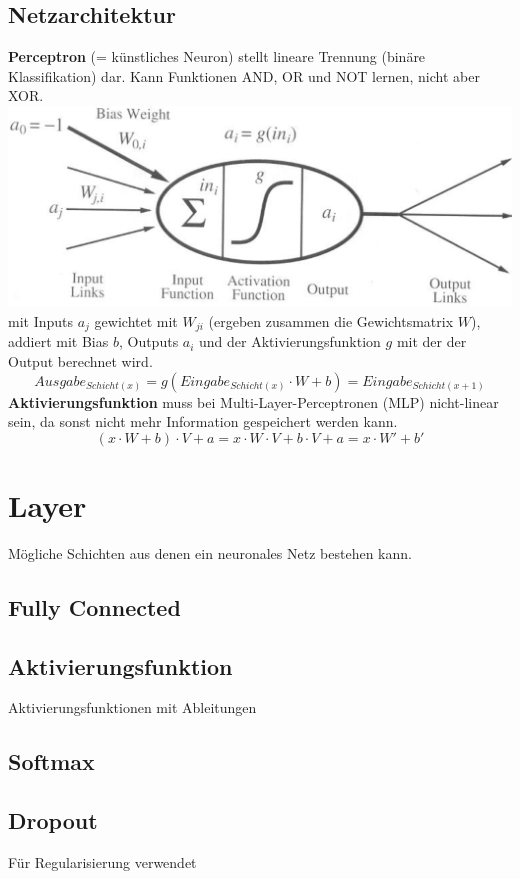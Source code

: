 \documentclass[12pt]{article}
\begin{document}
	\subsection{Netzarchitektur}
	\textbf{Perceptron} (= künstliches Neuron) stellt lineare Trennung (binäre Klassifikation) dar. Kann Funktionen AND, OR und NOT lernen, nicht aber XOR.\\
	\includegraphics[width=\linewidth]{figures/perceptron.png}\\
	mit Inputs $a_j$ gewichtet mit $W_{ji}$ (ergeben zusammen die Gewichtsmatrix $W$), addiert mit Bias $b$, Outputs $a_i$ und der Aktivierungsfunktion $g$ mit der der Output berechnet wird.
	$$Ausgabe_{Schicht(x)} = g(Eingabe_{Schicht(x)} \cdot W + b) = Eingabe_{Schicht(x+1)}$$
	\textbf{Aktivierungsfunktion} muss bei Multi-Layer-Perceptronen (MLP) nicht-linear sein, da sonst nicht mehr Information gespeichert werden kann.
	$$(x \cdot W + b) \cdot V + a = x \cdot W \cdot V + b \cdot V + a = x \cdot W' + b'$$

	\section{Layer}
	Mögliche Schichten aus denen ein neuronales Netz bestehen kann.
	\subsection{Fully Connected}
	\subsection{Aktivierungsfunktion}
	Aktivierungsfunktionen mit Ableitungen
	\subsection{Softmax}
	\subsection{Dropout}
	Für Regularisierung verwendet
\end{document}
